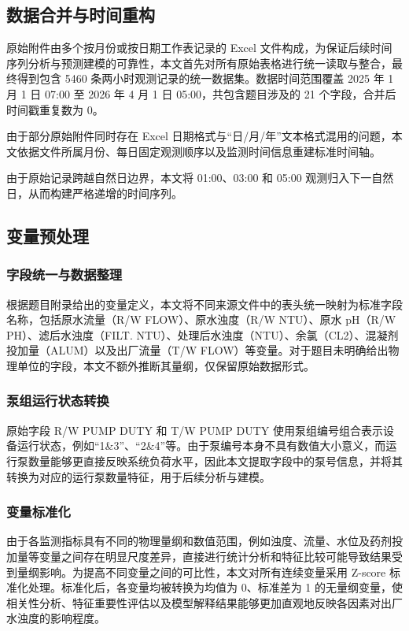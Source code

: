 \documentclass[UTF8,zihao=-4]{ctexart}
\begin{document}
\subsection{数据合并与时间重构}

原始附件由多个按月份或按日期工作表记录的 Excel 文件构成，为保证后续时间序列分析与预测建模的可靠性，本文首先对所有原始表格进行统一读取与整合，最终得到包含 5460 条两小时观测记录的统一数据集。数据时间范围覆盖 2025 年 1 月 1 日 07:00 至 2026 年 4 月 1 日 05:00，共包含题目涉及的 21 个字段，合并后时间戳重复数为 0。

由于部分原始附件同时存在 Excel 日期格式与“日/月/年”文本格式混用的问题，本文依据文件所属月份、每日固定观测顺序以及监测时间信息重建标准时间轴。

由于原始记录跨越自然日边界，本文将 01:00、03:00 和 05:00 观测归入下一自然日，从而构建严格递增的时间序列。

\subsection{变量预处理}

\subsubsection{字段统一与数据整理}

根据题目附录给出的变量定义，本文将不同来源文件中的表头统一映射为标准字段名称，包括原水流量（R/W FLOW）、原水浊度（R/W NTU）、原水 pH（R/W PH）、滤后水浊度（FILT. NTU）、处理后水浊度（NTU）、余氯（CL2）、混凝剂投加量（ALUM）以及出厂流量（T/W FLOW）等变量。对于题目未明确给出物理单位的字段，本文不额外推断其量纲，仅保留原始数据形式。

\subsubsection{泵组运行状态转换}
原始字段 R/W PUMP DUTY 和 T/W PUMP DUTY 使用泵组编号组合表示设备运行状态，例如“1\&3”、“2\&4”等。由于泵编号本身不具有数值大小意义，而运行泵数量能够更直接反映系统负荷水平，因此本文提取字段中的泵号信息，并将其转换为对应的运行泵数量特征，用于后续分析与建模。

\subsubsection{变量标准化}

由于各监测指标具有不同的物理量纲和数值范围，例如浊度、流量、水位及药剂投加量等变量之间存在明显尺度差异，直接进行统计分析和特征比较可能导致结果受到量纲影响。为提高不同变量之间的可比性，本文对所有连续变量采用 Z-score 标准化处理。标准化后，各变量均被转换为均值为 0、标准差为 1 的无量纲变量，使相关性分析、特征重要性评估以及模型解释结果能够更加直观地反映各因素对出厂水浊度的影响程度。
\end{document}
